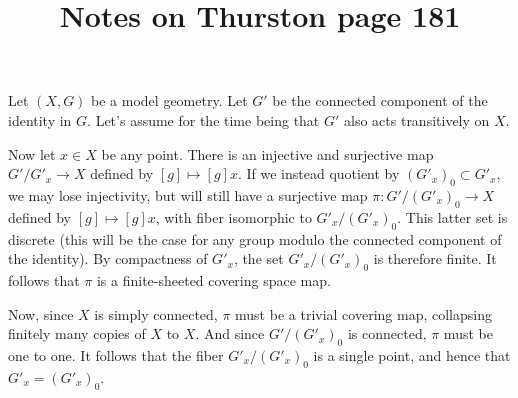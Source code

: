 \documentclass{amsart}
\newcommand{\+}[1]{\ensuremath{\mathbf{#1}}}
\theoremstyle{definition}
\begin{document}
\title{Notes on Thurston page 181}
\maketitle

Let $(X,G)$ be a model geometry.  
Let $G'$ be the connected component of the identity in $G$. 
Let's assume for the time being that $G'$ also acts transitively on $X$.


Now let $x \in X$ be any point.
There is an injective and surjective map $G' / G'_x \to X$ defined by $[g] \mapsto [g]x$.
If we instead quotient by $(G'_x)_0 \subset G'_x$, we may lose injectivity, but will still have a surjective map
$\pi: G'/(G'_x)_0  \to X$ defined by $[g] \mapsto [g]x$, with fiber isomorphic to $G'_x / (G'_x)_0$.
This latter set is discrete (this will be the case for any group modulo the connected
component of the identity).  By compactness of $G'_x$, the set  $G'_x / (G'_x)_0$ is therefore finite.
It follows that $\pi$ is a finite-sheeted covering space map.

Now, since $X$ is simply connected, $\pi$ must be a trivial covering map, collapsing finitely many copies of $X$ to $X$.
And since $G'/(G'_x)_0$ is connected, $\pi$ must be one to one.
It follows that the fiber $G'_x / (G'_x)_0$ is a single point, and hence that $G'_x = (G'_x)_0$.
\end{document}
